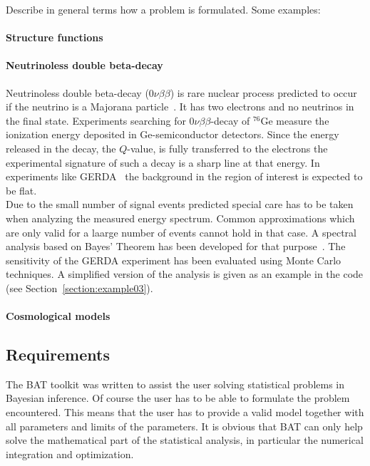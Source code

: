 \documentclass[11pt, a4paper]{article}
\begin{document}
Describe in general terms how a problem is formulated. Some examples:

\paragraph{Structure functions} 

\paragraph{Neutrinoless double beta-decay} 

Neutrinoless double beta-decay ($0\nu\beta\beta$) is rare nuclear
process predicted to occur if the neutrino is a Majorana
particle~\cite{Yao:2006px}. It has two electrons and no neutrinos in
the final state. Experiments searching for $0\nu\beta\beta$-decay of
$^{76}$Ge measure the ionization energy deposited in Ge-semiconductor
detectors. Since the energy released in the decay, the $Q$-value, is
fully transferred to the electrons the experimental signature of such
a decay is a sharp line at that energy. In experiments like
GERDA~\cite{Schonert:2005zn} the background in the region of interest
is expected to be flat. \\ 

\noindent 
Due to the small number of signal events predicted special care has to
be taken when analyzing the measured energy spectrum. Common
approximations which are only valid for a laarge number of events
cannot hold in that case. A spectral analysis based on Bayes' Theorem
has been developed for that purpose~\cite{Caldwell:2006yj}. The
sensitivity of the GERDA experiment has been evaluated using Monte
Carlo techniques. A simplified version of the analysis is given as an
example in the code (see Section~\ref{section:example03}). 

\paragraph{Cosmological models} 


\subsection{Requirements} 

The BAT toolkit was written to assist the user solving statistical
problems in Bayesian inference. Of course the user has to be able to
formulate the problem encountered. This means that the user has to
provide a valid model together with all parameters and limits of the
parameters. It is obvious that BAT can only help solve the
mathematical part of the statistical analysis, in particular the
numerical integration and optimization.  \\
\end{document}
